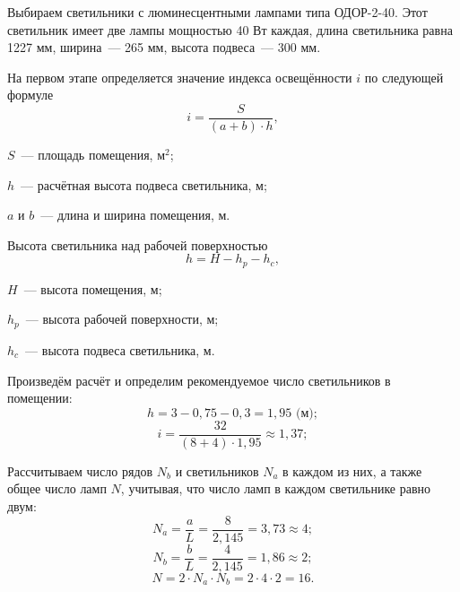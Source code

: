 Выбираем светильники с люминесцентными лампами типа ОДОР-2-40.
Этот светильник имеет две лампы мощностью 40 Вт каждая, длина светильника равна 1227 мм, ширина~--- 265 мм, высота подвеса~--- 300 мм.

На первом этапе определяется значение индекса освещённости $i$ по следующей формуле
\begin{equation}
    i = \frac{S}{(a + b) \cdot h},
\end{equation}
\begin{where}
    \item $S$~--- площадь помещения, $\text{м}^2$;
    \item $h$~--- расчётная высота подвеса светильника, м;
    \item $a$ и $b$~--- длина и ширина помещения, м.
\end{where}

Высота светильника над рабочей поверхностью
\begin{equation}
    h = H - h_p - h_c,
\end{equation}
\begin{where}
    \item $H$~--- высота помещения, м;
    \item $h_p$~--- высота рабочей поверхности, м;
    \item $h_c$~--- высота подвеса светильника, м.
\end{where}

Произведём расчёт и определим рекомендуемое число светильников в помещении:
$$h = 3 - 0,75 - 0,3 = 1,95 \text{ (м)};$$
$$i = \frac{32}{(8+4) \cdot 1,95} \approx 1,37;$$

Рассчитываем число рядов $N_b$ и светильников $N_a$ в каждом из них, а также общее число ламп $N$, учитывая, что число ламп в каждом светильнике равно двум:
$$N_a = \frac{a}{L} = \frac{8}{2,145} = 3,73 \approx 4;$$
$$N_b = \frac{b}{L} = \frac{4}{2,145} = 1,86 \approx 2;$$
$$N = 2 \cdot N_a \cdot N_b = 2 \cdot 4 \cdot 2 = 16.$$


